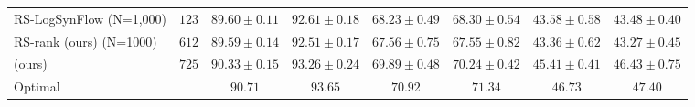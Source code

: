\documentclass[sigconf]{acmart}
\begin{document}
\begin{table*}[htb]
\begin{tabular}{@{}lccccccc@{}}
        RS-LogSynFlow (N=1,000) & $123$& $89.60 \pm 0.11$ & $92.61 \pm 0.18$ & $68.23 \pm 0.49$ & $68.30 \pm 0.54$  & $43.58 \pm 0.58$ & $43.48 \pm 0.40$ \\ 
        RS-rank (ours) (N=1000) & $612$& $89.59 \pm 0.14$ & $92.51 \pm 0.17$ & $67.56 \pm 0.75$ & $67.55 \pm 0.82$  & $43.36 \pm 0.62$ & $43.27 \pm 0.45$ \\ 
        \palg{} (ours)          & $725$& $90.33 \pm 0.15$ & $93.26 \pm 0.24$ & $69.89 \pm 0.48$ & $70.24 \pm 0.42$  & $45.41 \pm 0.41$ & $46.43 \pm 0.75$ \\ \midrule
        Optimal             &          & $90.71$          & $93.65$          & $70.92$          & $71.34$           & $46.73$          & $47.40$          \\ \bottomrule
        \end{tabular}
        \label{table:overall_sss}
          \vspace{-\baselineskip}
    \end{table*}
\end{document}

